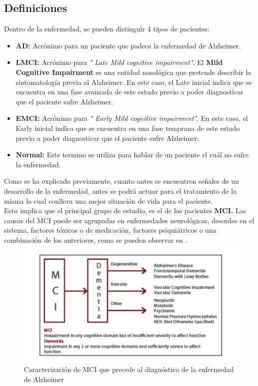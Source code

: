 \subsection{Definiciones}

Dentro de la enfermedad, se pueden distinguir 4 tipos de pacientes:\\

\begin{itemize}
	\item \textbf{AD: } Acrónimo para un paciente que padece la enfermedad de Alzheimer.
	\item \textbf{LMCI: } Acrónimo para \textit{" Late Mild cognitive impairment"}.  El \textbf{Mild Cognitive Impairment}  es una entidad nosológica que pretende describir la sintomatología previa al Alzheimer. En este caso, el Late inicial indica que se encuentra en una fase avanzada de este estado previo a poder diagnosticar que el paciente sufre Alzheimer.
	\item \textbf{EMCI: } Acrónimo para \textit{" Early Mild cognitive impairment"}.  En este caso, el Early inicial indica que se encuentra en una fase temprana de este estado previo a poder diagnosticar que el paciente sufre Alzheimer.
	\item \textbf{Normal: } Este termino se utiliza para hablar de un paciente el cuál no sufre la enfermedad.
\end{itemize}

Como se ha explicado previamente, cuanto antes se encuentren señales de un desarrollo de la enfermedad, antes se podrá actuar para el tratamiento de la misma lo cual conlleva una mejor situación de vida para el paciente.\\

Esto implica que el principal grupo de estudio, es el de los pacientes \textbf{MCI.}  Las causas del MCI puede ser agrupadas en enfermedades neurológicas, desordes en el sistema, factores tóxicos o de medicación, factores psiquiátricos o una combinación de los anteriores, como se pueden observar en 
\cite{pertersen2007}.

\begin{figure}[h]
	\label{figure1}
	\centering
	\includegraphics[width=\textwidth]{imagenes/figure1.png}
	\caption{Caracterización de MCI que precede al diagnóstico de la enfermedad de Alzheimer}
\end{figure}

